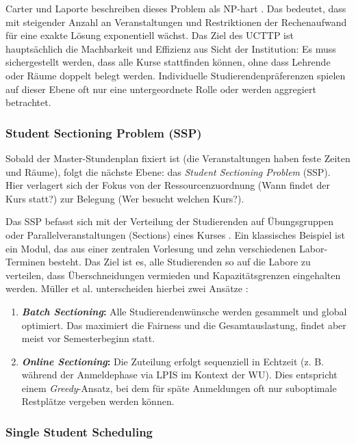 Carter und Laporte beschreiben dieses Problem als NP-hart \cite{carter-1996}. Das bedeutet, dass mit steigender Anzahl an Veranstaltungen und Restriktionen der Rechenaufwand für eine exakte Lösung exponentiell wächst. Das Ziel des UCTTP ist hauptsächlich die Machbarkeit und Effizienz aus Sicht der Institution: Es muss sichergestellt werden, dass alle Kurse stattfinden können, ohne dass Lehrende oder Räume doppelt belegt werden. Individuelle Studierendenpräferenzen spielen auf dieser Ebene oft nur eine untergeordnete Rolle oder werden aggregiert betrachtet.



\subsubsection{Student Sectioning Problem (SSP)}\label{chap:ssp}

Sobald der Master-Stundenplan fixiert ist (die Veranstaltungen haben feste Zeiten und Räume), folgt die nächste Ebene: das \textit{Student Sectioning Problem} (SSP). Hier verlagert sich der Fokus von der Ressourcenzuordnung (Wann findet der Kurs statt?) zur Belegung (Wer besucht welchen Kurs?).

Das SSP befasst sich mit der Verteilung der Studierenden auf Übungsgruppen oder Parallelveranstaltungen (Sections) eines Kurses \cite{muller-2010}. Ein klassisches Beispiel ist ein Modul, das aus einer zentralen Vorlesung und zehn verschiedenen Labor-Terminen besteht. Das Ziel ist es, alle Studierenden so auf die Labore zu verteilen, dass Überschneidungen vermieden und Kapazitätsgrenzen eingehalten werden. Müller et al. unterscheiden hierbei zwei Ansätze \cite{muller-2010}:

\begin{enumerate}
  \item \textbf{\textit{Batch Sectioning}:} Alle Studierendenwünsche werden gesammelt und global optimiert. Das maximiert die Fairness und die Gesamtauslastung, findet aber meist vor Semesterbeginn statt.
  \item \textbf{\textit{Online Sectioning}:} Die Zuteilung erfolgt sequenziell in Echtzeit (z. B. während der Anmeldephase via LPIS im Kontext der WU). Dies entspricht einem \textit{Greedy}-Ansatz, bei dem für späte Anmeldungen oft nur suboptimale Restplätze vergeben werden können.
\end{enumerate}



\subsubsection{Single Student Scheduling}

